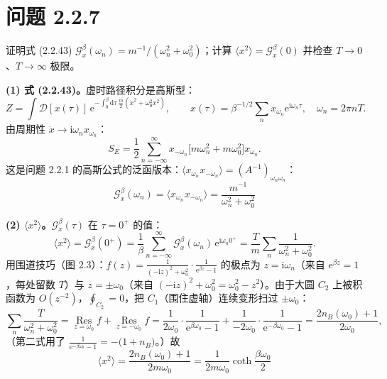 \section*{问题 2.2.7}
\begin{problem}
证明式 (2.2.43) $\mathcal G_x^\beta(\omega_n)=m^{-1}/(\omega_n^2+\omega_0^2)$；计算 $\langle x^2\rangle=\mathcal G_x^\beta(0)$ 并检查 $T\to0$、$T\to\infty$ 极限。
\end{problem}
\solution
\textbf{(1) 式 (2.2.43)。}虚时路径积分是高斯型：
\begin{equation*}
Z=\int\mathcal D[x(\tau)]\,\mathrm{e}^{-\int_0^\beta\mathrm{d}\tau\,\frac m2(\dot x^2+\omega_0^2x^2)},\qquad
x(\tau)=\beta^{-1/2}\sum_n x_{\omega_n}\mathrm{e}^{\mathrm{i}\omega_n\tau},\quad \omega_n=2\pi nT .
\end{equation*}
由周期性 $\dot x\to\mathrm{i}\omega_n x_{\omega_n}$：
\begin{equation*}
S_E=\frac12\sum_{n=-\infty}^{\infty}x_{-\omega_n}\big[m\omega_n^2+m\omega_0^2\big]x_{\omega_n}.
\end{equation*}
这是问题 2.2.1 的高斯公式的泛函版本：$\langle x_{\omega_n}x_{-\omega_n}\rangle=(A^{-1})_{\omega_n\omega_n}$：
\begin{equation*}
\boxed{\;\mathcal G_x^\beta(\omega_n)=\langle x_{\omega_n}x_{-\omega_n}\rangle=\frac{m^{-1}}{\omega_n^2+\omega_0^2}\;}
\end{equation*}

\textbf{(2) $\langle x^2\rangle$。}$\mathcal G_x^\beta(\tau)$ 在 $\tau=0^+$ 的值：
\begin{equation*}
\langle x^2\rangle=\mathcal G_x^\beta(0^+)=\frac1\beta\sum_{n=-\infty}^{\infty}\mathcal G_x^\beta(\omega_n)\,\mathrm{e}^{\mathrm{i}\omega_n0^+}
=\frac{T}{m}\sum_{n}\frac{1}{\omega_n^2+\omega_0^2}.
\end{equation*}
用围道技巧（图 2.3）：$f(z)=\frac{1}{(-\mathrm{i}z)^2+\omega_0^2}\cdot\frac{1}{\mathrm{e}^{\beta z}-1}$ 的极点为 $z=\mathrm{i}\omega_n$（来自 $\mathrm{e}^{\beta z}=1$，每处留数 $T$）与 $z=\pm\omega_0$（来自 $(-\mathrm{i}z)^2+\omega_0^2=\omega_0^2-z^2$）。由于大圆 $C_2$ 上被积函数为 $O(z^{-2})$，$\oint_{C_2}=0$，把 $C_1$（围住虚轴）连续变形扫过 $\pm\omega_0$：
\begin{equation*}
\sum_n\frac{T}{\omega_n^2+\omega_0^2}
=\operatorname*{Res}_{z=\omega_0}f+\operatorname*{Res}_{z=-\omega_0}f
=\frac{1}{2\omega_0}\cdot\frac{1}{\mathrm{e}^{\beta\omega_0}-1}
+\frac{1}{-2\omega_0}\cdot\frac{1}{\mathrm{e}^{-\beta\omega_0}-1}
=\frac{2n_B(\omega_0)+1}{2\omega_0},
\end{equation*}
（第二式用了 $\frac{1}{\mathrm{e}^{-\beta\omega_0}-1}=-\big(1+n_B\big)$。）故
\begin{equation*}
\boxed{\;\langle x^2\rangle=\frac{2n_B(\omega_0)+1}{2m\omega_0}
=\frac{1}{2m\omega_0}\coth\frac{\beta\omega_0}{2}\;}
\end{equation*}

